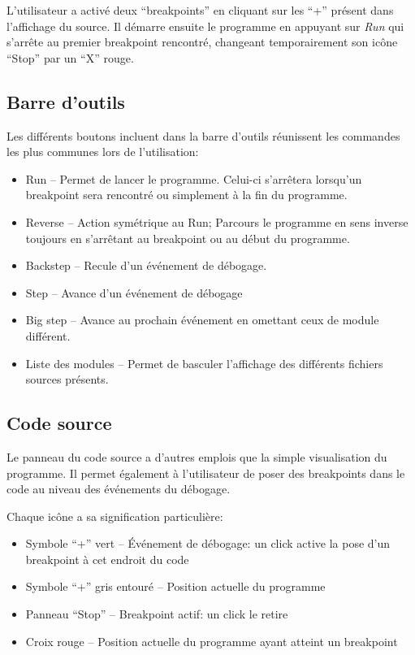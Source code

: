 \documentclass[11pt,a4paper]{report}
\begin{document}
L'utilisateur a activé deux ``breakpoints'' en cliquant sur les ``+'' présent dans l'affichage du source.
Il démarre ensuite le programme en appuyant sur \emph{Run} qui s'arrête au premier breakpoint rencontré,
changeant temporairement son icône ``Stop'' par un ``X'' rouge.

\subsection{Barre d'outils}

Les différents boutons incluent dans la barre d'outils réunissent les commandes les plus communes lors de l'utilisation:
\begin{itemize}
\item Run -- Permet de lancer le programme. Celui-ci s'arrêtera lorsqu'un breakpoint sera rencontré ou simplement à la fin du programme.
\item Reverse -- Action symétrique au Run; Parcours le programme en sens inverse toujours en s'arrêtant au breakpoint ou au début du programme.
\item Backstep -- Recule d'un événement de débogage.
\item Step -- Avance d'un événement de débogage
\item Big step -- Avance au prochain événement en omettant ceux de module différent.
\item Liste des modules -- Permet de basculer l'affichage des différents fichiers sources présents.
\end{itemize}

\subsection{Code source}

Le panneau du code source a d'autres emplois que la simple visualisation du programme. 
Il permet également à l'utilisateur de poser des breakpoints dans le code au niveau des événements du débogage.

Chaque icône a sa signification particulière:
\begin{itemize}
\item Symbole ``+'' vert -- \'Evénement de débogage: un click active la pose d'un breakpoint à cet endroit du code
\item Symbole ``+'' gris entouré -- Position actuelle du programme
\item Panneau ``Stop'' -- Breakpoint actif: un click le retire
\item Croix rouge -- Position actuelle du programme ayant atteint un breakpoint
\end{itemize}
\end{document}
